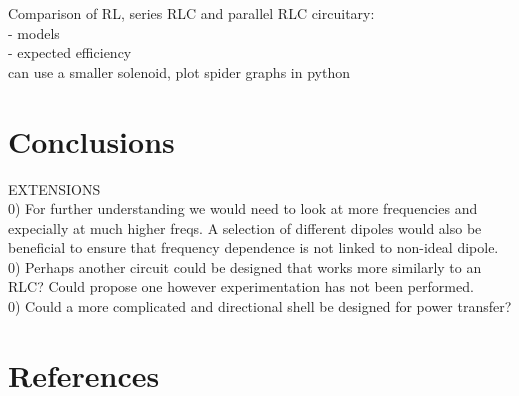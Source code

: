 \documentclass[11pt]{iopart}
\begin{document}
Comparison of RL, series RLC and parallel RLC circuitary: \\
- models \\
- expected efficiency \\


can use a smaller solenoid, plot spider graphs in python\\
\section{Conclusions}
EXTENSIONS \\
0) For further understanding we would need to look at more frequencies
and expecially at much higher freqs. A selection of different dipoles
would also be beneficial to ensure that frequency dependence is not
linked to non-ideal dipole.\\

0) Perhaps another circuit could be designed that works more similarly
to an RLC? Could propose one however experimentation has not been
performed.\\

0) Could a more complicated and directional shell be designed for
power transfer?\\
\section{References}
\end{document}
